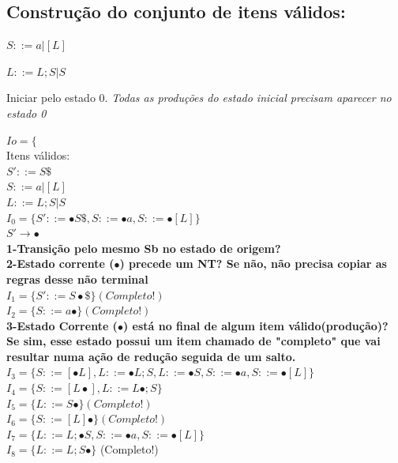 \documentclass[ 12pt, a4paper]{article}
\begin{document}
	\subsection{Construção do conjunto de itens válidos:}

		$S::= a|[L]$

		$L::= L;S | S$

		Iniciar pelo estado 0. \textit{Todas as produções do estado inicial precisam aparecer no estado 0}

		$Io =\{$\\
		Itens válidos:\\
		$S'::=S\$$\\
		$S::= a|[L]$\\
		$L::= L;S | S$\\
		$I_0 =\{S'::=\bullet S\$, S::=\bullet a,S::=\bullet [L]\}$\\
		$S'\to \bullet $\\
		\textbf{1-Transição pelo mesmo Sb no estado de origem?}\\
		\textbf{2-Estado corrente ($\bullet$) precede um NT? Se não, não precisa copiar as regras desse não terminal}\\
		$I_1 =\{S'::=S\bullet \$\}(Completo!)$\\
		$I_2 =\{S::=a\bullet \}(Completo!)$\\
		\textbf{3-Estado Corrente ($\bullet$) está no final de algum item válido(produção)? Se sim, esse estado possui um item chamado de "completo" que vai resultar numa ação de redução seguida de um salto.}\\
		$I_3 =\{S::=[\bullet L], L::= \bullet L;S, L::=\bullet S, S::=\bullet a, S::=\bullet [L] \}$\\
		$I_4 =\{S::=[L\bullet],L::=L\bullet ;S\}$\\
		$I_5 = \{ L::=S\bullet\}(Completo!)$\\
		$I_6 = \{ S::= [L]\bullet\}(Completo!)$\\
		$I_7 = \{ L::= L;\bullet S, S::= \bullet a, S::= \bullet [L] \}$\\
		$I_8 = \{ L::= L;S \bullet\} $ (Completo!)\\
\end{document}
